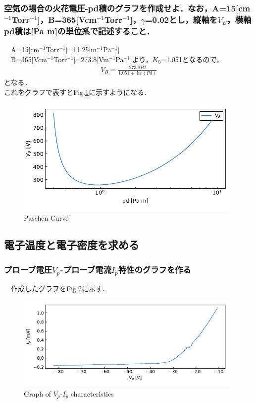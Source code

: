 \subsubsection{空気の場合の火花電圧-pd積のグラフを作成せよ．なお，A=15[cm$^{-1}$Torr$^{-1}$]，B=365[Vcm$^{-1}$Torr$^{-1}$]，$\gamma$=0.02とし，縦軸を$V_B$，横軸pd積は[Pa m]の単位系で記述すること．}
　A=15[cm$^{-1}$Torr$^{-1}$]=11.25[m$^{-1}$Pa$^{-1}$]\\
　B=365[Vcm$^{-1}$Torr$^{-1}$]=273.8[Vm$^{-1}$Pa$^{-1}$]より，$K_0$=1.051となるので，
\begin{eqnarray}
    V_B = \frac{273.8Pd}{1.051+\ln(Pd)}
\end{eqnarray}
となる．\\
これをグラフで表すとFig.\ref{fig:PaschenCurve}に示すようになる．
\begin{figure}[H]
    \centering
    \includegraphics[width=11cm]{./fig/PaschenCurve.pdf}
    \caption{Paschen Curve}
    \label{fig:PaschenCurve}
\end{figure}

\newpage
\subsection{電子温度と電子密度を求める}
\subsubsection{プローブ電圧$V_p$-プローブ電流$I_p$特性のグラフを作る}
　作成したグラフをFig.\ref{fig:Vp-Ip}に示す．
\begin{figure}[H]
    \centering
    \includegraphics[width=11cm]{./fig/3_1.pdf}
    \caption{Graph of $V_p$-$I_p$ characteristics}
    \label{fig:Vp-Ip}
\end{figure}

